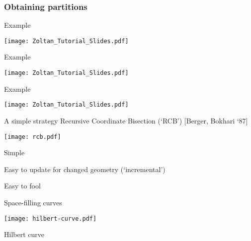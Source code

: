 \documentclass[english,compress]{beamer}
\begin{document}
\subsubsection{Obtaining partitions}
\begin{frame}{Example}
  \begin{center}
    \texttt{[image: Zoltan\_Tutorial\_Slides.pdf]}
  \end{center}
\end{frame}
\begin{frame}{Example}
  \begin{center}
  \texttt{[image: Zoltan\_Tutorial\_Slides.pdf]}
  \end{center}
\end{frame}
\begin{frame}{Example}
  \begin{center}
\texttt{[image: Zoltan\_Tutorial\_Slides.pdf]}
  \end{center}
\end{frame}
\begin{frame}{A simple strategy}
  Recursive Coordinate Bisection (`RCB')
  [Berger, Bokhari `87]

  \begin{center}
    \texttt{[image: rcb.pdf]}
  \end{center}

  \vspace{-1cm}
  \plusball Simple

  \plusball Easy to update for changed geometry (`incremental')

  \minusball Easy to fool

\end{frame}
\begin{frame}{Space-filling curves}
  \begin{center}
    \texttt{[image: hilbert-curve.pdf]}

    Hilbert curve
  \end{center}
\end{frame}
\end{document}
